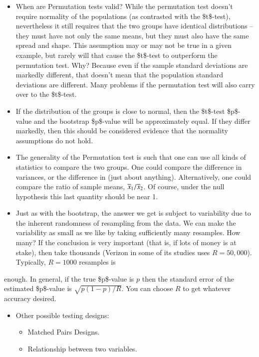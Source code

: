 \documentclass[11pt,english]{scrbook}
\begin{document}
\begin{itemize}
\item When are Permutation tests valid? While the permutation test doesn't require normality of the populations (as contrasted with the \$t\$-test), nevertheless it still requires that the two groups have identical distributions -- they must have not only the same means, but they must also have the same spread and shape. This assumption may or may not be true in a given example, but rarely will that cause the \$t\$-test to outperform the permutation test. Why? Because even if the sample standard deviations are markedly different, that doesn't mean that the population standard deviations are different. Many problems if the permutation test will also carry over to the \$t\$-test.

\item If the distribution of the groups is close to normal, then the \$t\$-test \$p\$-value and the bootstrap \$p\$-value will be approximately equal. If they differ markedly, then this should be considered evidence that the normality assumptions do not hold.

\item The generality of the Permutation test is such that one can use all kinds of statistics to compare the two groups. One could compare the difference in variances, or the difference in (just about anything). Alternatively, one could compare the ratio of sample means, \(\overline{x}_{1}/\overline{x}_{2}\). Of course, under the null hypothesis this last quantity should be near 1.

\item Just as with the bootstrap, the answer we get is subject to variability due to the inherent randomness of resampling from the data. We can make the variability as small as we like by taking sufficiently many resamples. How many? If the conclusion is very important (that is, if lots of money is at stake), then take thousands (Verizon in some of its studies uses \(R=50,000\)). Typically, \(R=1000\) resamples is
\end{itemize}
enough. In general, if the true \$p\$-value is \(p\) then the standard error of the estimated \$p\$-value is \(\sqrt{p(1-p)/R}\). You can choose \(R\) to get whatever accuracy desired. 

\begin{itemize}
\item Other possible testing designs:
\begin{itemize}
\item Matched Pairs Designs.
\item Relationship between two variables.
\end{itemize}
\end{itemize}
\end{document}
